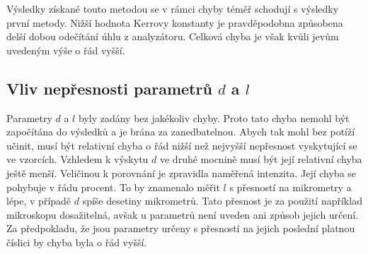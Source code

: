 \documentclass[a4paper,12pt]{article}
\begin{document}
Výsledky získané touto metodou se v rámci chyby téměř schodují s výsledky první metody. Nižší hodnota Kerrovy konstanty je pravděpodobna způsobena delší dobou odečítání 
úhlu z analyzátoru. Celková chyba je však kvůli jevům uvedeným výše o řád vyšší.

\subsection{Vliv nepřesnosti parametrů $d$ a $l$}
Parametry $d$ a $l$ byly zadány bez jakékoliv chyby. Proto tato chyba nemohl být započítána do výsledků a je brána za zanedbatelnou. Abych tak mohl bez potíží 
učinit, musí být relativní chyba o řád nižší než nejvyšší nepřesnost vyskytující se ve vzorcích. Vzhledem k výskytu $d$ ve druhé mocnině musí být její relativní chyba 
ještě menší. Veličinou k porovnání je zpravidla naměřená intenzita. Její chyba se pohybuje v řádu procent. To by znamenalo měřit $l$ s přesností na mikrometry a lépe, 
v případě $d$ spíše desetiny mikrometrů. Tato přesnost je za použití například mikroskopu dosažitelná, avšak u parametrů není uveden ani způsob jejich určení. Za předpokladu, 
že jsou parametry určeny s přesností na jejich poslední platnou číslici by chyba byla o řád vyšší.
\end{document}
